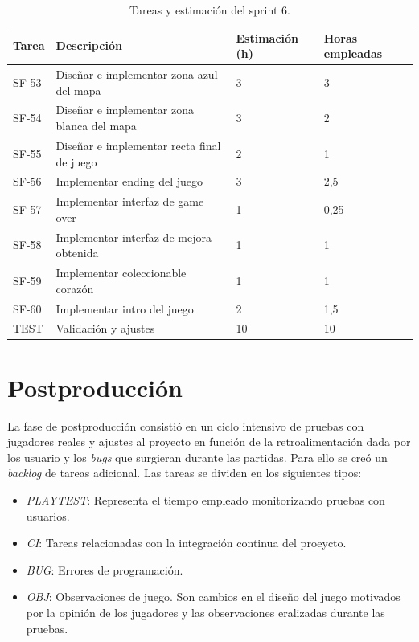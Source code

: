 \begin{table}[!ht]
    \centering
    \begin{tabular}{|l|p{8cm}|p{2cm}|p{2cm}|}
    \hline
        Tarea & Descripción & Estimación (h) & Horas empleadas \\ \hline
        SF-53 & Diseñar e implementar zona azul del mapa & 3 & 3 \\ \hline
        SF-54 & Diseñar e implementar zona blanca del mapa & 3 & 2 \\ \hline
        SF-55 & Diseñar e implementar recta final de juego & 2 & 1 \\ \hline
        SF-56 & Implementar ending del juego & 3 & 2,5 \\ \hline
        SF-57 & Implementar interfaz de game over & 1 & 0,25 \\ \hline
        SF-58 & Implementar interfaz de mejora obtenida & 1 & 1 \\ \hline
        SF-59 & Implementar coleccionable corazón & 1 & 1 \\ \hline
        SF-60 & Implementar intro del juego & 2 & 1,5 \\ \hline
        TEST & Validación y ajustes & 10 & 10 \\ \hline
    \end{tabular}
    \caption{Tareas y estimación del sprint 6.}
    \label{tab:sprint6task}
\end{table}


\section{Postproducción}

La fase de postproducción consistió en un ciclo intensivo de pruebas con jugadores reales y ajustes al proyecto en función de la retroalimentación dada por los usuario y los \textit{bugs} que surgieran durante las partidas. Para ello se creó un \textit{backlog} de tareas adicional. Las tareas se dividen en los siguientes tipos:

\begin{itemize}
    \item \textit{PLAYTEST}: Representa el tiempo empleado monitorizando pruebas con usuarios.
    \item \textit{CI}: Tareas relacionadas con la integración continua del proeycto.
    \item \textit{BUG}: Errores de programación.
    \item \textit{OBJ}: Observaciones de juego. Son cambios en el diseño del juego motivados por la opinión de los jugadores y las observaciones eralizadas durante las pruebas.
\end{itemize}


